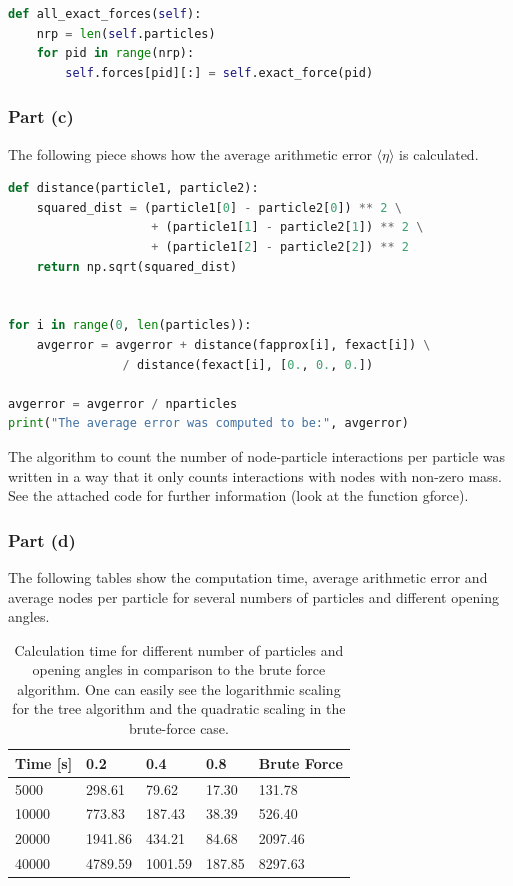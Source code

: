 \documentclass{scrartcl}
\begin{document}
\begin{lstlisting}[title=Code for the computation of the exact forces on a particle.,language=Python, frame=single]
def all_exact_forces(self):
	nrp = len(self.particles)
	for pid in range(nrp):
		self.forces[pid][:] = self.exact_force(pid)
\end{lstlisting}
\subsubsection*{Part (c)}

The following piece shows how the average arithmetic error \( \langle \eta \rangle \) is calculated.
\begin{lstlisting}[title=Code for the computation of the relative average error.,language=Python, frame=single]
def distance(particle1, particle2):
	squared_dist = (particle1[0] - particle2[0]) ** 2 \
					+ (particle1[1] - particle2[1]) ** 2 \
					+ (particle1[2] - particle2[2]) ** 2
	return np.sqrt(squared_dist)


for i in range(0, len(particles)):
	avgerror = avgerror + distance(fapprox[i], fexact[i]) \
				/ distance(fexact[i], [0., 0., 0.])

avgerror = avgerror / nparticles
print("The average error was computed to be:", avgerror)
\end{lstlisting}

The algorithm to count the number of node-particle interactions per particle was written in a way that it only counts interactions with nodes with non-zero mass. See the attached code for further information (look at the function gforce).

\subsubsection*{Part (d)}

The following tables show the computation time, average arithmetic error and average nodes per particle for several numbers of particles and different opening angles.
\begin{table}[ht]
	\centering
	\begin{tabular}{|l|l|l|l||l|}
		\hline
		Time [s] & 0.2 & 0.4 & 0.8 & Brute Force \\ \hline
		5000        & 298.61       	   & 79.62     	   	& 17.30  & 131.78 \\ \hline
		10000       & 773.83           & 187.43			& 38.39  & 526.40  \\ \hline
		20000       & 1941.86          & 434.21        	& 84.68  & 2097.46\\ \hline
		40000       & 4789.59          & 1001.59       	& 187.85 & 8297.63 \\ \hline
	\end{tabular}
	\caption{Calculation time for different number of particles and opening angles in comparison to the brute force algorithm. One can easily see the logarithmic scaling for the tree algorithm and the quadratic scaling in the brute-force case.}
\end{table}
\end{document}
